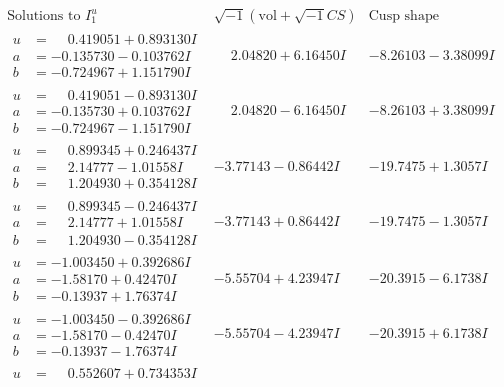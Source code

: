 \documentclass[1p]{elsarticle_modified}
\theoremstyle{definition}
\newcommand{\I}{\sqrt{-1}}
\begin{document}
$$\begin{array}{c|c|c}  
\text{Solutions to }I^u_{1}& \I (\text{vol} + \sqrt{-1}CS) & \text{Cusp shape}\\
 \hline 
\begin{aligned}
u &= \phantom{-}0.419051 + 0.893130 I \\
a &= -0.135730 - 0.103762 I \\
b &= -0.724967 + 1.151790 I\end{aligned}
 & \phantom{-}2.04820 + 6.16450 I & -8.26103 - 3.38099 I \\ \hline\begin{aligned}
u &= \phantom{-}0.419051 - 0.893130 I \\
a &= -0.135730 + 0.103762 I \\
b &= -0.724967 - 1.151790 I\end{aligned}
 & \phantom{-}2.04820 - 6.16450 I & -8.26103 + 3.38099 I \\ \hline\begin{aligned}
u &= \phantom{-}0.899345 + 0.246437 I \\
a &= \phantom{-}2.14777 - 1.01558 I \\
b &= \phantom{-}1.204930 + 0.354128 I\end{aligned}
 & -3.77143 - 0.86442 I & -19.7475 + 1.3057 I \\ \hline\begin{aligned}
u &= \phantom{-}0.899345 - 0.246437 I \\
a &= \phantom{-}2.14777 + 1.01558 I \\
b &= \phantom{-}1.204930 - 0.354128 I\end{aligned}
 & -3.77143 + 0.86442 I & -19.7475 - 1.3057 I \\ \hline\begin{aligned}
u &= -1.003450 + 0.392686 I \\
a &= -1.58170 + 0.42470 I \\
b &= -0.13937 + 1.76374 I\end{aligned}
 & -5.55704 + 4.23947 I & -20.3915 - 6.1738 I \\ \hline\begin{aligned}
u &= -1.003450 - 0.392686 I \\
a &= -1.58170 - 0.42470 I \\
b &= -0.13937 - 1.76374 I\end{aligned}
 & -5.55704 - 4.23947 I & -20.3915 + 6.1738 I \\ \hline\begin{aligned}
u &= \phantom{-}0.552607 + 0.734353 I \\

\end{aligned}
\end{array}$$
\end{document}
